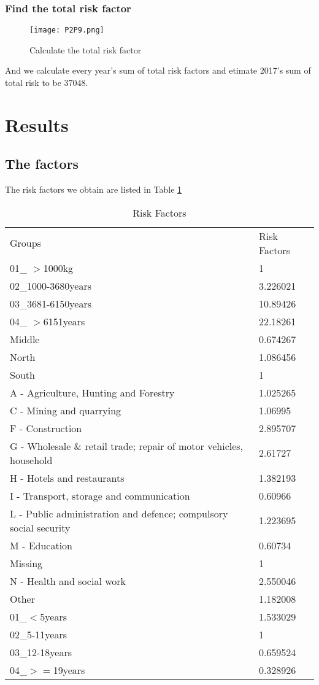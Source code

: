 \documentclass[11pt]{article}
\begin{document}
\subsubsection{Find the total risk factor}

\begin{figure}[!htb]
\centering
\texttt{[image: P2P9.png]}
\caption{Calculate the total risk factor}
\label{Fig9}
\end{figure}

And we calculate every year's sum of total risk factors and etimate 2017's sum of total risk to be $37048$.


\section{Results}

\subsection{The factors}
The risk factors we obtain are listed in Table {\ref{Table4}}
\begin{table}[!h]
  \centering

    \begin{tabular}{ll}
    Groups     & \multicolumn{1}{l}{Risk Factors} \\
    01\_ $>$1000kg & 1 \\
    02\_1000-3680years & 3.226021 \\
    03\_3681-6150years & 10.89426 \\
    04\_ $>$6151years & 22.18261 \\
    Middle & 0.674267 \\
    North & 1.086456 \\
    South & 1 \\
    A - Agriculture, Hunting and Forestry & 1.025265 \\
    C - Mining and quarrying & 1.06995 \\
    F - Construction & 2.895707 \\
    G - Wholesale \& retail trade; repair of motor vehicles, household & 2.61727 \\
    H - Hotels and restaurants & 1.382193 \\
    I - Transport, storage and communication & 0.60966 \\
    L - Public administration and defence; compulsory social security & 1.223695 \\
    M - Education & 0.60734 \\
    Missing & 1 \\
    N - Health and social work & 2.550046 \\
    Other & 1.182008 \\
    01\_$<$5years & 1.533029 \\
    02\_5-11years & 1 \\
    03\_12-18years & 0.659524 \\
    04\_$>=$19years & 0.328926 \\
    \end{tabular}%
  \caption{Risk Factors}
  \label{Table4}%
\end{table}%
\end{document}
